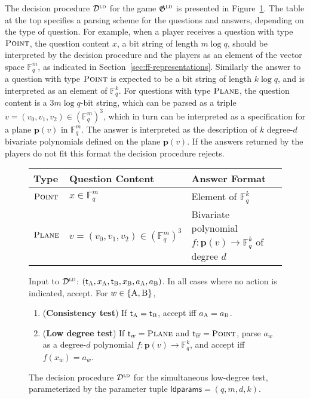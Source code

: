 \documentclass[11pt]{article}
\theoremstyle{definition}
\newcommand{\F}{\ensuremath{\mathbb{F}}}
\newcommand{\ld}{\textsc{ld}}
\newcommand{\pl}{\mathbf{p}}
\newcommand{\game}{\mathfrak{G}}
\newcommand{\decider}{\mathcal{D}}
\newcommand{\labelstyle}[1]{\ensuremath{\textsc{#1}}\xspace}
\newcommand{\tvarstyle}[1]{\mathsf{#1}}
\newcommand{\tvar}{\ensuremath{\tvarstyle{t}}}
\newcommand{\alice}{\labelstyle{A}}
\newcommand{\bob}{\labelstyle{B}}
\newcommand{\typestyle}[1]{\ensuremath{\textsc{#1}}\xspace}
\newcommand{\Plane}{\typestyle{Plane}}
\newcommand{\Point}{\typestyle{Point}}
\newcommand{\AB}{\{\alice, \bob\}}
\newcommand{\ldc}{k} %
\newcommand{\ldparams}{\mathsf{ldparams}}
\newenvironment{gamespec}{
  \begin{mdframed}[style=figstyle]}{
  \end{mdframed}}
\begin{document}
The decision procedure $\decider^\ld$ for the game $\game^\ld$ is presented in
Figure~\ref{fig:ld-decider}.
The table at the top specifies a parsing scheme for the questions and answers,
depending on the type of question.
For example, when a player receives a question with type $\Point$, the question
content $x$, a bit string of length $m \log q$, should be interpreted by the
decision procedure and the players as an element of the vector space $\F_q^m$,
as indicated in Section~\ref{sec:ff-representations}.
Similarly the answer to a question with type $\Point$ is expected to be a bit
string of length $\ldc \log q$, and is interpreted as an element of $\F_q^\ldc$.
For questions with type $\Plane$, the question content is a $3 m \log q$-bit
string, which can be parsed as a triple $v = (v_0, v_1, v_2) \in (\F_q^{m})^3$,
which in turn can be interpreted as a specification for a plane $\pl(v)$ in
$\F_q^m$.
The answer is interpreted as the description of $\ldc$ degree-$d$ bivariate
polynomials defined on the plane $\pl(v)$.
If the answers returned by the players do not fit this format the decision
procedure rejects.

\begin{figure}[!htbp]
  \centering
  \begin{gamespec}
    \setlength{\tabcolsep}{1em}
    \begin{tabularx}{\textwidth}{ l   l   X   }
      \toprule
      Type & Question Content & Answer Format \\
      \midrule
      $\Point$ & $ x \in \F_q^m$ & Element of $\F_q^\ldc$  \\
      $\Plane$ & $ v = (v_0,v_1,v_2) \in  (\F_q^{m})^3$ &
      Bivariate polynomial $f: \pl(v) \to \F_q^\ldc$ of degree $d$\\
      \bottomrule
    \end{tabularx}

    \vspace{1em}

    Input to $\decider^\ld$: $(\tvar_\alice,x_\alice, \tvar_\bob, x_\bob,
    a_\alice, a_\bob)$.
    In all cases where no action is indicated, accept.
    For $w \in \AB$,

    \begin{enumerate}
      \setlength\itemsep{1pt}
    \item (\textbf{Consistency test}) If $\tvar_\alice = \tvar_\bob$, accept iff
      $a_\alice = a_\bob$.
    \item (\textbf{Low degree test}) If $\tvar_w = \Plane$ and
      $\tvar_{\overline{w}} = \Point$, parse $a_w$ as a degree-$d$ polynomial $f
      : \pl(v) \to \F_q^\ldc$, and accept iff $f(x_{\overline{w}}) =
      a_{\overline{w}}$.
    \end{enumerate}
  \end{gamespec}
  \caption{The decision procedure $\decider^\ld$ for the simultaneous low-degree
    test, parameterized by the parameter tuple $\ldparams = (q,m,d,\ldc)$.}
  \label{fig:ld-decider}
\end{figure}
\end{document}
